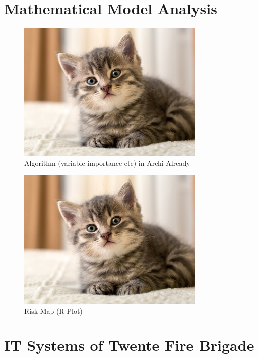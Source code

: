 \documentclass{utitcphd_overleaf}
\begin{document}
\section{Mathematical Model Analysis}

\begin{figure}[ht]
  \centering
  \includegraphics[width=0.8\textwidth]{my_images/kitten.jpeg}
  \caption{Algorithm (variable importance etc) in Archi Already}
  \label{fig:yourlabel}
\end{figure}

\begin{figure}[ht]
  \centering
  \includegraphics[width=0.8\textwidth]{my_images/kitten.jpeg}
  \caption{Risk Map (R Plot)}
  \label{fig:yourlabel}
\end{figure}


\section{IT Systems of Twente Fire Brigade}
\end{document}
